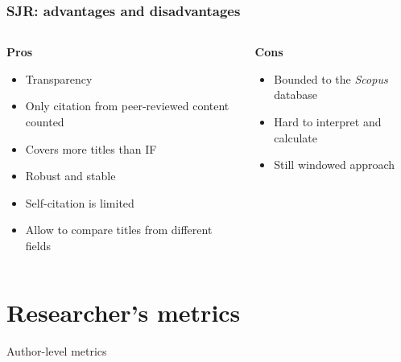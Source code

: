 \documentclass{beamer}
\newcommand{\pros}{\item[{\textcolor[HTML]{3C8031}{\ding{51}}}]}
\newcommand{\cons}{\item[\textcolor{red}{\ding{54}}]}
\newcommand{\sco}{\textit{Scopus} }
\begin{document}
\begin{frame}
    \frametitle{SJR: advantages and disadvantages}
    \begin{columns}[T]
        \begin{column}{.5\textwidth}
            \centering \textbf{Pros}
            \begin{itemize}[<+->]
                \pros Transparency
                \pros Only citation from peer-reviewed content counted
                \pros Covers more titles than IF
                \pros Robust and stable
                \pros Self-citation is limited
                \pros Allow to compare titles from different fields
            \end{itemize}
        \end{column}
        \begin{column}{.5\textwidth}
            \centering \textbf{Cons}
            \begin{itemize}[<+->]
                \cons Bounded to the \sco database
                \cons Hard to interpret and calculate
                \cons Still windowed approach
            \end{itemize}
        \end{column}
    \end{columns}
\end{frame}

\section{Researcher's metrics}
\begin{frame}
    \centering
    \Huge
    Author-level metrics
\end{frame}
\end{document}
